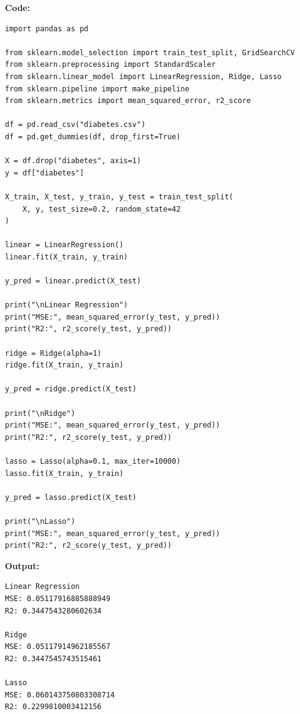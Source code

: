 \documentclass[12pt, a4paper]{article}
\begin{document}
\vspace{\baselineskip}
\noindent \textbf{Code:}\\
\begin{lstlisting}
import pandas as pd

from sklearn.model_selection import train_test_split, GridSearchCV
from sklearn.preprocessing import StandardScaler
from sklearn.linear_model import LinearRegression, Ridge, Lasso
from sklearn.pipeline import make_pipeline
from sklearn.metrics import mean_squared_error, r2_score

df = pd.read_csv("diabetes.csv")
df = pd.get_dummies(df, drop_first=True)

X = df.drop("diabetes", axis=1)
y = df["diabetes"]

X_train, X_test, y_train, y_test = train_test_split(
    X, y, test_size=0.2, random_state=42
)

linear = LinearRegression()
linear.fit(X_train, y_train)

y_pred = linear.predict(X_test)

print("\nLinear Regression")
print("MSE:", mean_squared_error(y_test, y_pred))
print("R2:", r2_score(y_test, y_pred))

ridge = Ridge(alpha=1)
ridge.fit(X_train, y_train)

y_pred = ridge.predict(X_test)

print("\nRidge")
print("MSE:", mean_squared_error(y_test, y_pred))
print("R2:", r2_score(y_test, y_pred))

lasso = Lasso(alpha=0.1, max_iter=10000)
lasso.fit(X_train, y_train)

y_pred = lasso.predict(X_test)

print("\nLasso")
print("MSE:", mean_squared_error(y_test, y_pred))
print("R2:", r2_score(y_test, y_pred))

\end{lstlisting}

\vspace{\baselineskip}

\noindent \textbf{Output:}\\
\begin{lstlisting}[style=terminal]
Linear Regression
MSE: 0.05117916885888949
R2: 0.3447543280602634

Ridge
MSE: 0.05117914962185567
R2: 0.3447545743515461

Lasso
MSE: 0.060143750803308714
R2: 0.2299810003412156
\end{lstlisting}

\vspace{\baselineskip}
\end{document}
